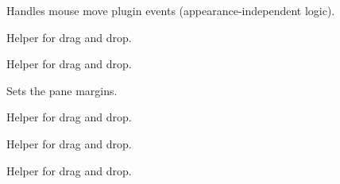 \label{cbrowdragpluginonmousemove}


Handles mouse move plugin events (appearance-independent logic).


\label{cbrowdragpluginprepareforrowdrag}


Helper for drag and drop.


\label{cbrowdragpluginsetmousecapture}


Helper for drag and drop.


\label{cbrowdragpluginsetpanemargins}


Sets the pane margins.


\label{cbrowdragpluginshowdraggedrow}


Helper for drag and drop.


\label{cbrowdragpluginshowpaneimage}


Helper for drag and drop.


\label{cbrowdragpluginunhighlightiteminfocus}


Helper for drag and drop.

